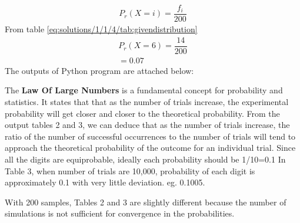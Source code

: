 \begin{align}
    P_r (X=i)= \dfrac{{f}_{i}}{200}
\end{align}
From table \ref{eq:solutions/1/1/4/tab:givendistribution}
\begin{align}
    P_r (X=6)= \dfrac{14}{200}\\
    =0.07
\end{align}
The outputs of Python program are attached below:


The \textbf{Law Of Large Numbers} is a fundamental concept for probability and statistics. It states that  that as the number of trials increase, the experimental probability will get closer and closer to the theoretical probability.
 From the output tables 2 and 3, we can deduce that as the number of trials increase,  the ratio of the number of successful occurrences to the number of trials will tend to approach the theoretical probability of the outcome for an individual trial. 
Since all the digits are equiprobable, ideally each probability should be 1/10=0.1
 In Table 3, when number of trials are 10,000, probability of each digit is approximately 0.1 with very little deviation. eg. 0.1005.  

With 200 samples, Tables 2 and 3 are slightly different because the number of simulations is not sufficient for convergence in the probabilities.
